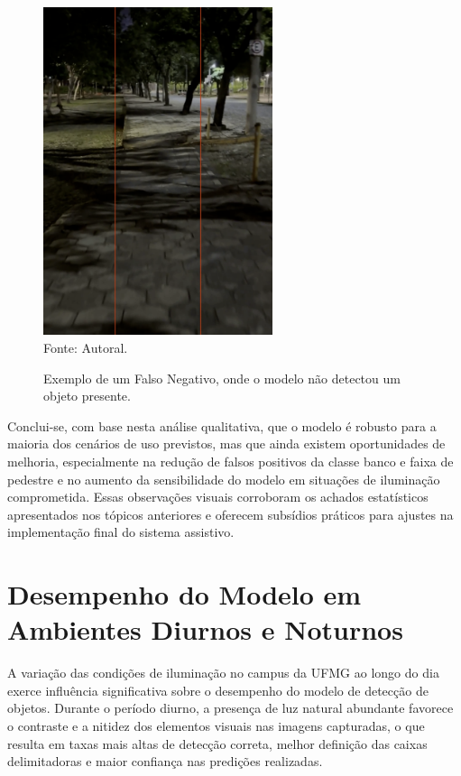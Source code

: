 \begin{figure}[htbp]
  \centering
  \caption{Exemplo de um Falso Negativo, onde o modelo não detectou um objeto presente.}
  \includegraphics[width=0.6\textwidth]{Figuras/falso_negativo.png}
  \\
  Fonte: Autoral.
  \label{fg-falso_negativo}
\end{figure}

Conclui-se, com base nesta análise qualitativa, que o modelo é robusto para a maioria dos cenários de uso previstos, mas que ainda existem oportunidades de melhoria, especialmente na redução de falsos positivos da classe banco e faixa de pedestre e no aumento da sensibilidade do modelo em situações de iluminação comprometida. Essas observações visuais corroboram os achados estatísticos apresentados nos tópicos anteriores e oferecem subsídios práticos para ajustes na implementação final do sistema assistivo.

\section{\textbf{Desempenho do Modelo em Ambientes Diurnos e Noturnos}}

A variação das condições de iluminação no campus da UFMG ao longo do dia exerce influência significativa sobre o desempenho do modelo de detecção de objetos. Durante o período diurno, a presença de luz natural abundante favorece o contraste e a nitidez dos elementos visuais nas imagens capturadas, o que resulta em taxas mais altas de detecção correta, melhor definição das caixas delimitadoras e maior confiança nas predições realizadas. 

